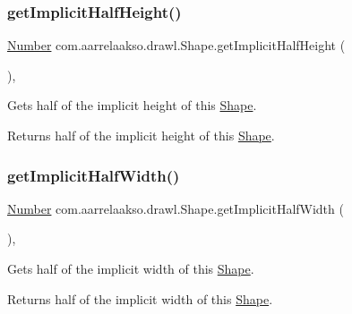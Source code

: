\subsubsection{\texorpdfstring{get\+Implicit\+Half\+Height()}{getImplicitHalfHeight()}}
{\footnotesize\ttfamily \hyperlink{interfacecom_1_1aarrelaakso_1_1drawl_1_1_number}{Number} com.\+aarrelaakso.\+drawl.\+Shape.\+get\+Implicit\+Half\+Height (\begin{DoxyParamCaption}{ }\end{DoxyParamCaption})\hspace{0.3cm}{\ttfamily [protected]}, {\ttfamily [inherited]}}



Gets half of the implicit height of this \hyperlink{classcom_1_1aarrelaakso_1_1drawl_1_1_shape}{Shape}. 

\begin{DoxyReturn}{Returns}
half of the implicit height of this \hyperlink{classcom_1_1aarrelaakso_1_1drawl_1_1_shape}{Shape}. 
\end{DoxyReturn}
\mbox{\label{classcom_1_1aarrelaakso_1_1drawl_1_1_shape_a02d73887a309bcd1178b142ad0c7edd9}} 
\subsubsection{\texorpdfstring{get\+Implicit\+Half\+Width()}{getImplicitHalfWidth()}}
{\footnotesize\ttfamily \hyperlink{interfacecom_1_1aarrelaakso_1_1drawl_1_1_number}{Number} com.\+aarrelaakso.\+drawl.\+Shape.\+get\+Implicit\+Half\+Width (\begin{DoxyParamCaption}{ }\end{DoxyParamCaption})\hspace{0.3cm}{\ttfamily [protected]}, {\ttfamily [inherited]}}



Gets half of the implicit width of this \hyperlink{classcom_1_1aarrelaakso_1_1drawl_1_1_shape}{Shape}. 

\begin{DoxyReturn}{Returns}
half of the implicit width of this \hyperlink{classcom_1_1aarrelaakso_1_1drawl_1_1_shape}{Shape}. 
\end{DoxyReturn}
\mbox{\label{classcom_1_1aarrelaakso_1_1drawl_1_1_shape_a3b0ad73b41fe8c9ae66d20f7fc1de7c9}} 

